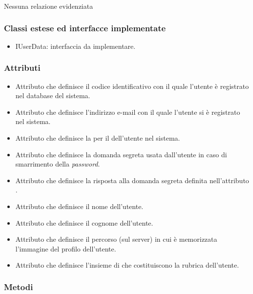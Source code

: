 Nessuna relazione evidenziata

\subsubsection*{Classi estese ed interfacce implementate}
\begin{itemize}
		\item{IUserData}: interfaccia da implementare.
\end{itemize}

\subsubsection*{Attributi}

\begin{itemize}
	\item{}
	Attributo che definisce il codice identificativo con il quale l'utente è registrato nel database del sistema.
	\item{}
	Attributo che definisce l'indirizzo e-mail con il quale l'utente si è registrato nel sistema.
	\item{}
	Attributo che definisce la  per il  dell'utente nel sistema.
	\item{}
	Attributo che definisce la domanda segreta usata dall'utente in caso di smarrimento della \textit{password}.
	\item{}
	Attributo che definisce la risposta alla domanda segreta definita nell'attributo .
	\item{}
	Attributo che definisce il nome dell'utente.
	\item{}
	Attributo che definisce il cognome dell'utente.
	\item{}
	Attributo che definisce il percorso (sul server) in cui è memorizzata l'immagine del profilo dell'utente.
	\item{}
	Attributo che definisce l'insieme di  che costituiscono la rubrica dell'utente.
	
\end{itemize}

\subsubsection*{Metodi}

